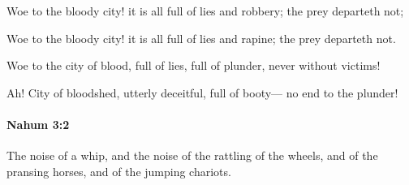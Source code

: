 			Woe to the bloody city! it is all full of lies and robbery; the prey departeth not;

			\begin{versebox}
					\item[BHS] 
					\item[LXX] 
					\item[ASV] Woe to the bloody city! it is all full of lies and rapine; the prey departeth not.
					\item[NIV] Woe to the city of blood, full of lies, full of plunder, never without victims!
					\item[NRSV] Ah! City of bloodshed, utterly deceitful, full of booty— no end to the plunder!
			\end{versebox}

		\paragraph{Nahum 3:2} %
			\label{NAHUM-3-2}

			The noise of a whip, and the noise of the rattling of the wheels, and of the pransing horses, and of the jumping chariots.

